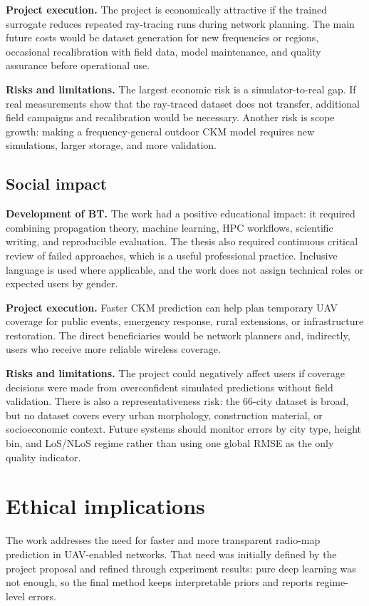 \textbf{Project execution.} The project is economically attractive if the
trained surrogate reduces repeated ray-tracing runs during network planning.
The main future costs would be dataset generation for new frequencies or
regions, occasional recalibration with field data, model maintenance, and
quality assurance before operational use.

\textbf{Risks and limitations.} The largest economic risk is a simulator-to-real
gap. If real measurements show that the ray-traced dataset does not transfer,
additional field campaigns and recalibration would be necessary. Another risk
is scope growth: making a frequency-general outdoor CKM model requires new
simulations, larger storage, and more validation.

\subsection{Social impact}

\textbf{Development of BT.} The work had a positive educational impact: it
required combining propagation theory, machine learning, HPC workflows,
scientific writing, and reproducible evaluation. The thesis also required
continuous critical review of failed approaches, which is a useful professional
practice. Inclusive language is used where applicable, and the work does not
assign technical roles or expected users by gender.

\textbf{Project execution.} Faster CKM prediction can help plan temporary UAV
coverage for public events, emergency response, rural extensions, or
infrastructure restoration. The direct beneficiaries would be network planners
and, indirectly, users who receive more reliable wireless coverage.

\textbf{Risks and limitations.} The project could negatively affect users if
coverage decisions were made from overconfident simulated predictions without
field validation. There is also a representativeness risk: the 66-city dataset
is broad, but no dataset covers every urban morphology, construction material,
or socioeconomic context. Future systems should monitor errors by city type,
height bin, and LoS/NLoS regime rather than using one global RMSE as the only
quality indicator.

\section{Ethical implications}

The work addresses the need for faster and more transparent radio-map
prediction in UAV-enabled networks. That need was initially defined by the
project proposal and refined through experiment results: pure deep learning was
not enough, so the final method keeps interpretable priors and reports
regime-level errors.

